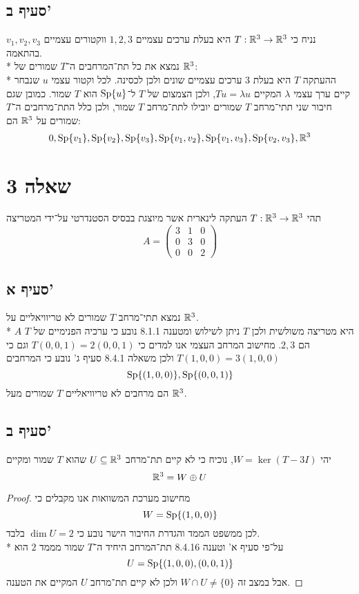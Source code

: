 \subsection{סעיף ב'}
נניח כי $T : \mathbb{R}^3 \to \mathbb{R}^3$ היא בעלת ערכים עצמיים $1, 2, 3$ ווקטורים עצמיים $v_1, v_2, v_3$ בהתאמה. \\*
נמצא את כל תת־המרחבים ה־$T$ שמורים של $\mathbb{R}^3$: \\*
ההעתקה $T$ היא בעלת $3$ ערכים עצמיים שונים ולכן לכסינה. לכל וקטור עצמי $u$ שנבחר קיים ערך עצמי $\lambda$ המקיים $T u = \lambda u$,
ולכן הצמצום של $T$ ל־$\operatorname{Sp}\{ u \}$ הוא $T$ שמור.
כמובן שגם חיבור שני תתי־מרחב $T$ שמורים יובילו לתת־מרחב $T$ שמור, ולכן כלל התת־מרחבים ה־$T$ שמורים על $\mathbb{R}^3$ הם:
\[
	0,
	\operatorname{Sp}\{ v_1 \},
	\operatorname{Sp}\{ v_2 \},
	\operatorname{Sp}\{ v_3 \},
	\operatorname{Sp}\{ v_1, v_2 \},
	\operatorname{Sp}\{ v_1, v_3 \},
	\operatorname{Sp}\{ v_2, v_3 \},
	\mathbb{R}^3
\]

\section{שאלה 3}
תהי $T : \mathbb{R}^3 \to \mathbb{R}^3$ העתקה לינארית אשר מיוצגת בבסיס הסטנדרטי על־ידי המטריצה
\[
	A = \begin{pmatrix}
		3 & 1 & 0 \\
		0 & 3 & 0 \\
		0 & 0 & 2
	\end{pmatrix}
\]
\subsection{סעיף א'}
נמצא תתי־מרחב $T$ שמורים לא טריוויאליים על $\mathbb{R}^3$. \\*
$A$ היא מטריצה משולשית ולכן $T$ ניתן לשילוש ומטענה 8.1.1 נובע כי ערכיה הפנימיים של $T$ הם $2, 3$.
מחישוב המרחב העצמי אנו למדים כי $T(0, 0, 1) = 2(0, 0, 1)$ וגם כי $T(1, 0, 0) = 3(1, 0, 0)$ ולכן משאלה 8.4.1 סעיף ג' נובע כי המרחבים
\[
	\operatorname{Sp}\{ (1, 0, 0) \},
	\operatorname{Sp}\{ (0, 0, 1) \}
\]
הם מרחבים לא טריוויאליים $T$ שמורים מעל $\mathbb{R}^3$.

\subsection{סעיף ב'}
יהי $W = \ker(T - 3I)$, נוכיח כי לא קיים תת־מרחב $U \subseteq \mathbb{R}^3$ שהוא $T$ שמור ומקיים
\[
	\mathbb{R}^3 = W \oplus U
\]
\begin{proof}
	מחישוב מערכת המשוואות אנו מקבלים כי
	\[
		W = \operatorname{Sp}\{ (1, 0, 0) \}
	\]
	לכן ממשפט הממד והגדרת החיבור הישר נובע כי $\dim U = 2$ בלבד. \\*
	על־פי סעיף א' וטענה 8.4.16 תת־המרחב היחיד ה־$T$ שמור מממד $2$ הוא
	\[
		U = \operatorname{Sp}\{ (1, 0, 0), (0, 0, 1) \}
	\]
	אבל במצב זה $W \cap U \ne \{ 0 \}$ ולכן לא קיים תת־מרחב $U$ המקיים את הטענה.
\end{proof}

